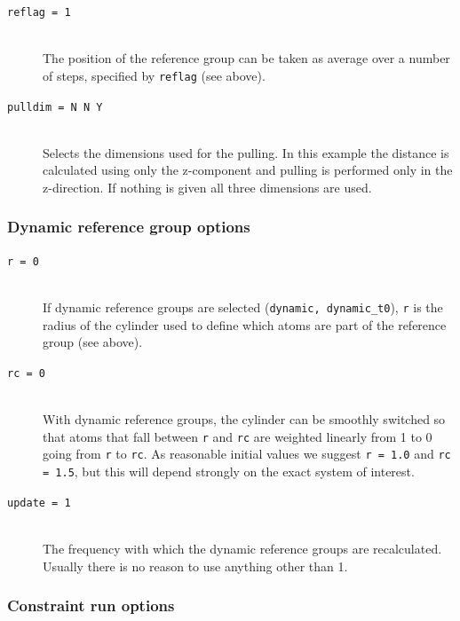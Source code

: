 \begin{description}
\item[\tt reflag                   = 1]\mbox{}\\
The position of the reference group can be taken as average over a
number of steps, specified by {\tt reflag} (see above).

\item[\tt pulldim                  = N N Y]\mbox{}\\
Selects the dimensions used for the pulling.
In this example the distance is calculated using only the z-component
and pulling is performed only in the z-direction.
If nothing is given all three dimensions are used.

\end{description}

\subsubsection{Dynamic reference group options}

\begin{description}

\item[\tt r                        = 0]\mbox{}\\
If dynamic reference groups are selected ({\tt dynamic, dynamic\_t0}),
{\tt r} is the radius of the cylinder used to define which atoms are
part of the reference group (see above).

\item[\tt rc                       = 0]\mbox{}\\
With dynamic reference groups, the cylinder can be smoothly switched
so that atoms that fall between {\tt r} and {\tt rc} are weighted
linearly from 1 to 0 going from {\tt r} to {\tt rc}. As reasonable
initial values we suggest {\tt r = 1.0} and {\tt rc = 1.5}, but this
will depend strongly on the exact system of interest.

\item[\tt update                   = 1]\mbox{}\\
The frequency with which the dynamic reference groups are
recalculated. Usually there is no reason to use anything other than 1.

\end{description}

\subsubsection{Constraint run options}

